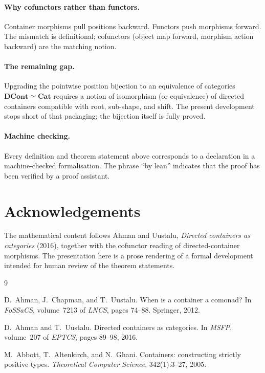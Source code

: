 \documentclass[11pt,a4paper]{article}
\theoremstyle{plain}
\theoremstyle{definition}
\newcommand{\DCont}{\mathbf{DCont}}
\newcommand{\Cat}{\mathbf{Cat}}
\begin{document}
\paragraph{Why cofunctors rather than functors.}
Container morphisms pull positions backward. Functors push morphisms forward.
The mismatch is definitional; cofunctors (object map forward, morphism action
backward) are the matching notion.

\paragraph{The remaining gap.}
Upgrading the pointwise position bijection to an equivalence of categories
$\DCont\simeq\Cat$ requires a notion of isomorphism (or equivalence) of
directed containers compatible with root, sub-shape, and shift. The present
development stops short of that packaging; the bijection itself is fully
proved.

\paragraph{Machine checking.}
Every definition and theorem statement above corresponds to a declaration in a
machine-checked formalisation. The phrase ``by lean'' indicates that the proof
has been verified by a proof assistant.

\section*{Acknowledgements}

The mathematical content follows Ahman and Uustalu, \emph{Directed containers
as categories} (2016), together with the cofunctor reading of
directed-container morphisms. The presentation here is a prose rendering of a
formal development intended for human review of the theorem statements.

\begin{thebibliography}{9}

D.~Ahman, J.~Chapman, and T.~Uustalu.
\newblock When is a container a comonad?
\newblock In \emph{FoSSaCS}, volume~7213 of \emph{LNCS}, pages 74--88.
\newblock Springer, 2012.

D.~Ahman and T.~Uustalu.
\newblock Directed containers as categories.
\newblock In \emph{MSFP}, volume~207 of \emph{EPTCS}, pages 89--98, 2016.

M.~Abbott, T.~Altenkirch, and N.~Ghani.
\newblock Containers: constructing strictly positive types.
\newblock \emph{Theoretical Computer Science}, 342(1):3--27, 2005.

\end{thebibliography}
\end{document}
